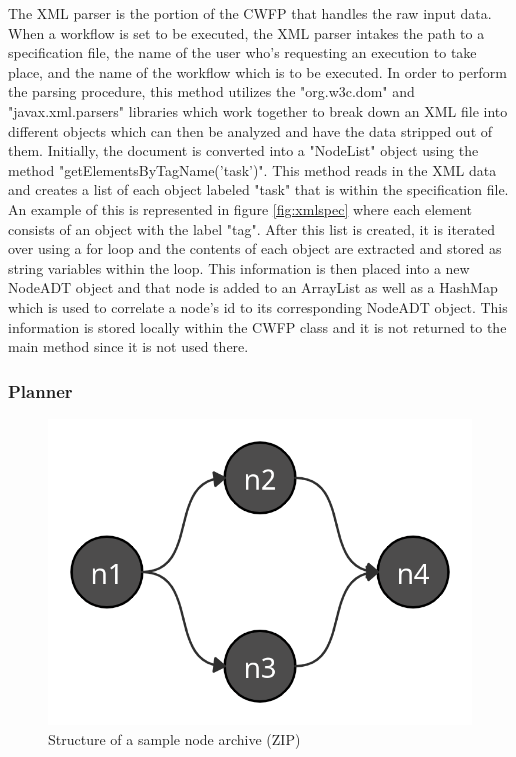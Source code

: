 \documentclass[fleqn,10pt]{SelfArx} %
\begin{document}
The XML parser is the portion of the CWFP that handles the raw input data. When a workflow is set to be executed, the XML parser intakes the path to a specification file, the name of the user who’s requesting an execution to take place, and the name of the workflow which is to be executed. In order to perform the parsing procedure, this method utilizes the "org.w3c.dom" and "javax.xml.parsers" libraries which work together to break down an XML file into different objects which can then be analyzed and have the data stripped out of them. Initially, the document is converted into a "NodeList" object using the method "getElementsByTagName('task')". This method reads in the XML data and creates a list of each object labeled "task" that is within the specification file. An example of this is represented in figure \ref{fig:xmlspec} where each element consists of an object with the label "tag". After this list is created, it is iterated over using a for loop and the contents of each object are extracted and stored as string variables within the loop. This information is then placed into a new NodeADT object and that node is added to an ArrayList as well as a HashMap which is used to correlate a node’s id to its corresponding NodeADT object. This information is stored locally within the CWFP class and it is not returned to the main method since it is not used there.

\subsubsection{Planner}

\begin{figure}[t!]
\centering
\includegraphics[width=\linewidth]{Figures/dag_example.png}
\caption{Structure of a sample node archive (ZIP)}
\label{fig:dagexample}
\end{figure}
\end{document}
